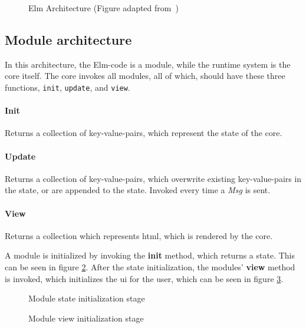 \begin{figure}[H]
  \centering
  
  \caption{Elm Architecture (Figure adapted from~\cite{elmFig})}
  \label{fig:elmArchitecture}
\end{figure}

\subsection{Module architecture}

In this architecture, the Elm-code is a module, while the runtime system is the
core itself. The core invokes all modules, all of which, should have these three
functions, \lstinline{init}, \lstinline{update}, and \lstinline{view}.

\paragraph{Init} Returns a collection of key-value-pairs, which represent
the state of the core.

\paragraph{Update} Returns a collection of key-value-pairs, which
overwrite existing key-value-pairs in the state, or are appended to the state.
Invoked every time a \textit{Msg} is sent.

\paragraph{View} Returns a collection which represents \gls*{html},
which is rendered by the core.

A module is initialized by invoking the \textbf{init} method, which returns a
state. This can be seen in figure \ref{fig:moduleInit}. After the state
initialization, the modules' \textbf{view} method is invoked, which initializes
the \gls*{ui} for the user, which can be seen in figure \ref{fig:moduleInitView}.

\begin{figure}[H]
  \centering
  
  \caption{Module state initialization stage}
  \label{fig:moduleInit}
\end{figure}

\begin{figure}[H]
  \centering
  
  \caption{Module view initialization stage}
  \label{fig:moduleInitView}
\end{figure}

